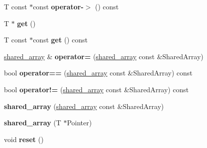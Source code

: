\begin{DoxyCompactItemize}
\item 
\hypertarget{classgli_1_1shared__array_ac903f7c198f54d6886823a73275fba54}{\-T const $\ast$const {\bfseries operator-\/$>$} () const }\label{classgli_1_1shared__array_ac903f7c198f54d6886823a73275fba54}

\item 
\hypertarget{classgli_1_1shared__array_a336f8894f2669b7c10c4560fe7bba778}{\-T $\ast$ {\bfseries get} ()}\label{classgli_1_1shared__array_a336f8894f2669b7c10c4560fe7bba778}

\item 
\hypertarget{classgli_1_1shared__array_ae7fd24b8a0a26004ea942d3fb2bf0573}{\-T const $\ast$const {\bfseries get} () const }\label{classgli_1_1shared__array_ae7fd24b8a0a26004ea942d3fb2bf0573}

\item 
\hypertarget{classgli_1_1shared__array_aaa9f9c179f54f2dd7dfa65277be59772}{\hyperlink{classgli_1_1shared__array}{shared\-\_\-array} \& {\bfseries operator=} (\hyperlink{classgli_1_1shared__array}{shared\-\_\-array} const \&\-Shared\-Array)}\label{classgli_1_1shared__array_aaa9f9c179f54f2dd7dfa65277be59772}

\item 
\hypertarget{classgli_1_1shared__array_aa9285c927e76ca392ef8e5501f4297e2}{bool {\bfseries operator==} (\hyperlink{classgli_1_1shared__array}{shared\-\_\-array} const \&\-Shared\-Array) const }\label{classgli_1_1shared__array_aa9285c927e76ca392ef8e5501f4297e2}

\item 
\hypertarget{classgli_1_1shared__array_a264bbbd47660940c332414a8fea949be}{bool {\bfseries operator!=} (\hyperlink{classgli_1_1shared__array}{shared\-\_\-array} const \&\-Shared\-Array) const }\label{classgli_1_1shared__array_a264bbbd47660940c332414a8fea949be}

\item 
\hypertarget{classgli_1_1shared__array_a783bc1b2def1bf24320f622b8440c189}{{\bfseries shared\-\_\-array} (\hyperlink{classgli_1_1shared__array}{shared\-\_\-array} const \&\-Shared\-Array)}\label{classgli_1_1shared__array_a783bc1b2def1bf24320f622b8440c189}

\item 
\hypertarget{classgli_1_1shared__array_a25ed750ea0276322f2257d3c41ad897e}{{\bfseries shared\-\_\-array} (\-T $\ast$\-Pointer)}\label{classgli_1_1shared__array_a25ed750ea0276322f2257d3c41ad897e}

\item 
\hypertarget{classgli_1_1shared__array_a630434d326e5819e611af0fe64bb96e8}{void {\bfseries reset} ()}\label{classgli_1_1shared__array_a630434d326e5819e611af0fe64bb96e8}


\end{DoxyCompactItemize}
